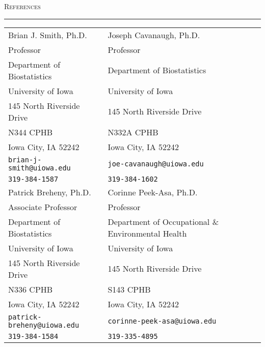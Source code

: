 \documentclass[a4paper]{article}
\begin{document}
\newpage

\begin{flushleft}
  \Large\textsc{References}
  \textcolor{usafagrey}{\rule[0.5\baselineskip]{\textwidth}{0.75pt}}
\end{flushleft}
\vspace{-\baselineskip}

\begin{tabular*}{0.9\textwidth}{@{\extracolsep{\fill}}ll}
  Brian J. Smith, Ph.D.              & Joseph Cavanaugh, Ph.D.\\
  Professor                          & Professor \\
  Department of Biostatistics        & Department of Biostatistics \\
  University of Iowa                 & University of Iowa \\
  145 North Riverside Drive          & 145 North Riverside Drive \\
  N344 CPHB                          & N332A CPHB \\
  Iowa City, IA 52242                & Iowa City, IA 52242 \\
  \texttt{brian-j-smith@uiowa.edu}   & \texttt{joe-cavanaugh@uiowa.edu} \\
  \texttt{319-384-1587}              & \texttt{319-384-1602} \\[10pt]
  Patrick Breheny, Ph.D.             & Corinne Peek-Asa, Ph.D.\\
  Associate Professor                & Professor \\
  Department of Biostatistics        & Department of Occupational \& Environmental Health \\
  University of Iowa                 & University of Iowa \\
  145 North Riverside Drive          & 145 North Riverside Drive \\
  N336 CPHB                          & S143 CPHB \\
  Iowa City, IA 52242                & Iowa City, IA 52242 \\
  \texttt{patrick-breheny@uiowa.edu} & \texttt{corinne-peek-asa@uiowa.edu} \\
  \texttt{319-384-1584}              & \texttt{319-335-4895}
\end{tabular*}


\end{document}
